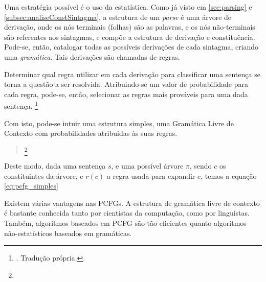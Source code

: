 Uma estratégia possível é o uso da estatística. Como já visto em \ref{sec:parsing} e \ref{subsec:analiseConstSintagma}, a estrutura de um \textit{parse} é uma árvore de derivação, onde os nós terminais (folhas) são as palavras, e os nós não-terminais são referentes aos sintagmas, e compõe a estrutura de derivação e constituência. Pode-se, então, catalogar todas as possíveis derivações de cada sintagma, criando uma \textit{gramática}. Tais derivações são chamadas de regras.

Determinar qual regra utilizar em cada derivação para classificar uma sentença se torna a questão a ser resolvida. Atribuindo-se um valor de probabilidade para cada regra, pode-se, então, selecionar as regras mais prováveis para uma dada sentença.  
\footnote{. Tradução própria.}

Com isto, pode-se intuir uma estrutura simples, uma Gramática Livre de Contexto com probabilidades atribuidas às suas regras. 
\begin{quote}
    \footnote{}
\end{quote}
    
Deste modo, dada uma sentença $s$, e uma possível árvore $\pi$, sendo $c$ os constituintes da árvore, e $r(c)$ a regra usada para expandir c, temos a equação \ref{eq:pcfg_simples}
\begin{center}
       
\end{center}
Existem várias vantagens nas PCFGs. A estrutura de gramática livre de contexto é bastante conhecida tanto por cientistas da computação, como por linguistas. Também,  algoritmos baseados em PCFG são tão eficientes quanto algoritmos não-estatísticos baseados em gramáticas.

